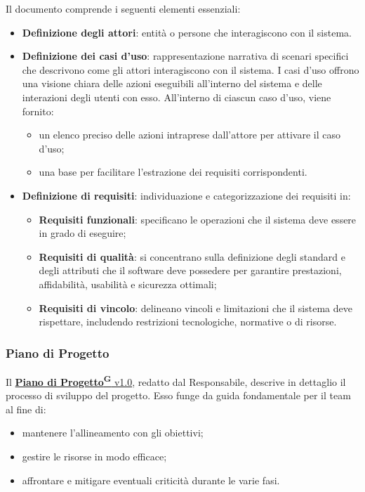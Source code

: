Il documento comprende i seguenti elementi essenziali:
\begin{itemize}
    \item \textbf{Definizione degli attori}: entità o persone che interagiscono con il sistema.
    \item \textbf{Definizione dei casi d’uso}: rappresentazione narrativa di scenari specifici che descrivono come gli attori interagiscono con il sistema. I casi d’uso offrono una visione chiara delle azioni eseguibili all’interno del sistema e delle interazioni degli utenti con esso. All’interno di ciascun caso d’uso, viene fornito:
    \begin{itemize}
        \item un elenco preciso delle azioni intraprese dall’attore per attivare il caso d’uso;
        \item una base per facilitare l’estrazione dei requisiti corrispondenti.
    \end{itemize}
    \item \textbf{Definizione di requisiti}: individuazione e categorizzazione dei requisiti in:
    \begin{itemize}
        \item \textbf{Requisiti funzionali}: specificano le operazioni che il sistema deve essere in grado di eseguire;
        \item \textbf{Requisiti di qualità}: si concentrano sulla definizione degli standard e degli attributi che il software deve possedere per garantire prestazioni, affidabilità, usabilità e sicurezza ottimali;
        \item \textbf{Requisiti di vincolo}: delineano vincoli e limitazioni che il sistema deve rispettare, includendo restrizioni tecnologiche, normative o di risorse.
    \end{itemize}
\end{itemize}

\subsubsection{Piano di Progetto}
Il \href{https://code7crusaders.github.io/docs/RTB/documentazione_interna/glossario.html#piano-di-progetto}{\textbf{Piano di Progetto\textsuperscript{G}} v1.0}, redatto dal Responsabile, descrive in dettaglio il processo di sviluppo del progetto. Esso funge da guida fondamentale per il team al fine di:
\begin{itemize}
    \item mantenere l’allineamento con gli obiettivi;
    \item gestire le risorse in modo efficace;
    \item affrontare e mitigare eventuali criticità durante le varie fasi.
\end{itemize}

